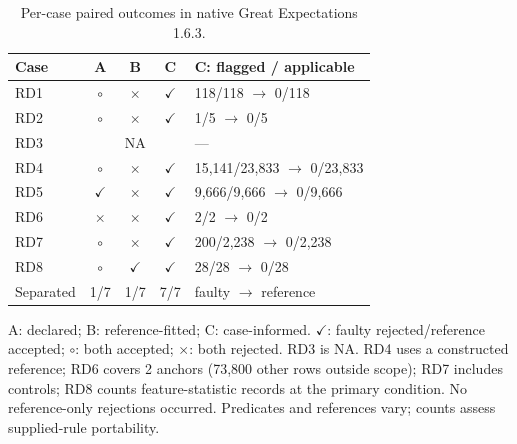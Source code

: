 \begin{table}[t]
\centering
\footnotesize
\caption{Per-case paired outcomes in native Great Expectations 1.6.3.}
\label{tab:gx}
\renewcommand{\arraystretch}{1.12}
\setlength{\tabcolsep}{5pt}
\begin{tabular}{@{}lcccl@{}}
\toprule
\textbf{Case} & \textbf{A} & \textbf{B} & \textbf{C} & \textbf{C: flagged / applicable} \\
\midrule
RD1 & $\circ$ & $\times$ & $\checkmark$ & 118/118 $\to$ 0/118 \\
RD2 & $\circ$ & $\times$ & $\checkmark$ & 1/5 $\to$ 0/5 \\
RD3 & \multicolumn{3}{c}{NA} & --- \\
RD4 & $\circ$ & $\times$ & $\checkmark$ & 15,141/23,833 $\to$ 0/23,833 \\
RD5 & $\checkmark$ & $\times$ & $\checkmark$ & 9,666/9,666 $\to$ 0/9,666 \\
RD6 & $\times$ & $\times$ & $\checkmark$ & 2/2 $\to$ 0/2 \\
RD7 & $\circ$ & $\times$ & $\checkmark$ & 200/2,238 $\to$ 0/2,238 \\
RD8 & $\circ$ & $\checkmark$ & $\checkmark$ & 28/28 $\to$ 0/28 \\
\midrule
Separated & 1/7 & 1/7 & 7/7 & faulty $\to$ reference \\
\bottomrule
\end{tabular}
\par\vspace{3pt}
\begin{minipage}{\columnwidth}\footnotesize
A: declared; B: reference-fitted; C: case-informed. $\checkmark$: faulty rejected/reference accepted; $\circ$: both accepted; $\times$: both rejected. RD3 is NA. RD4 uses a constructed reference; RD6 covers 2 anchors (73,800 other rows outside scope); RD7 includes controls; RD8 counts feature-statistic records at the primary condition. No reference-only rejections occurred. Predicates and references vary; counts assess supplied-rule portability.
\end{minipage}
\end{table}
